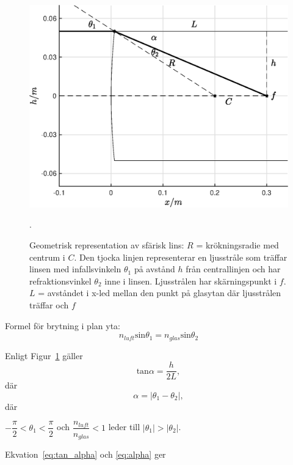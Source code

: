 \begin{figure}[H]
    \centering
    \captionsetup{justification=centering,margin=2cm}
    \includegraphics[scale=0.7]{Resources/Graphics/fig4_2.eps}
    \caption{Geometrisk representation av sfärisk lins: $R$ = krökningsradie med centrum i $C$. Den tjocka linjen representerar en ljusstråle som träffar linsen med infallsvinkeln $\theta_1$ på avstånd $h$ från centrallinjen och har refraktionsvinkel $\theta_2$ inne i linsen. Ljusstrålen har skärningspunkt i $f$. $L$ = avståndet i x-led mellan den punkt på glasytan där ljusstrålen träffar och $f$}.
    \label{fig:4_2}
\end{figure}

Formel för brytning i plan yta:
\begin{equation} \label{eq:n_luft}
    n_{luft}\text{sin}\theta_1 = n_{glas} \text{sin}\theta_2
\end{equation}

Enligt Figur~\ref{fig:4_2} gäller
\begin{equation} \label{eq:tan_alpha}
    \text{tan}\alpha = \dfrac{h}{2L},
\end{equation}
där 
\begin{equation} \label{eq:alpha}
    \alpha = |\theta_1 - \theta_2|,
\end{equation}
där

\begin{center}
    $-\dfrac{\pi}{2}<\theta_1 <\dfrac{\pi}{2}$
    \quad och \quad
    $\dfrac{n_{luft}}{n_{glas}} < 1$
    \quad leder till \quad $|\theta_1| > |\theta_2|$.
\end{center}
Ekvation~\ref{eq:tan_alpha} och \ref{eq:alpha} ger

